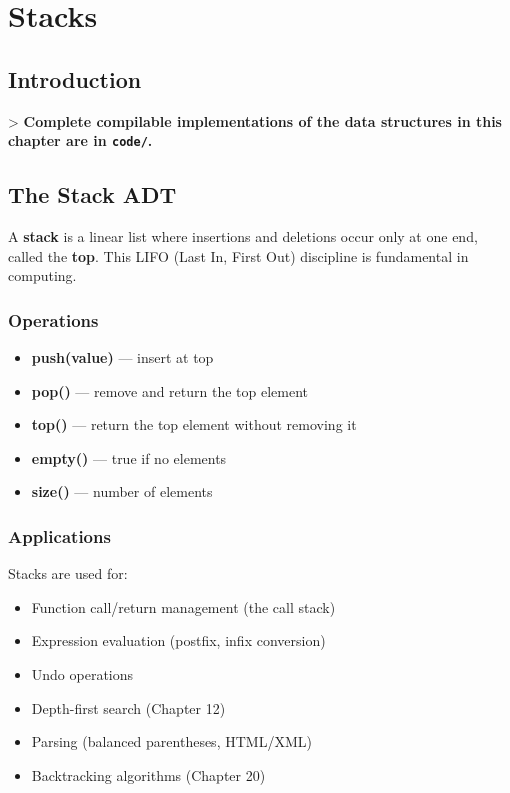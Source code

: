 \chapter{Stacks}\label{ch06:stacks}

\section{Introduction}

> \textbf{Complete compilable implementations of the data structures in this chapter are in \texttt{code/}.}

\section{The Stack ADT}

A \textbf{stack} is a linear list where insertions and deletions occur only at one end, called the \textbf{top}. This LIFO (Last In, First Out) discipline is fundamental in computing.

\subsection{Operations}

\begin{itemize}
\item \textbf{push(value)} — insert at top
\item \textbf{pop()} — remove and return the top element
\item \textbf{top()} — return the top element without removing it
\item \textbf{empty()} — true if no elements
\item \textbf{size()} — number of elements
\end{itemize}

\subsection{Applications}

Stacks are used for:
\begin{itemize}
\item Function call/return management (the call stack)
\item Expression evaluation (postfix, infix conversion)
\item Undo operations
\item Depth-first search (Chapter 12)
\item Parsing (balanced parentheses, HTML/XML)
\item Backtracking algorithms (Chapter 20)
\end{itemize}

